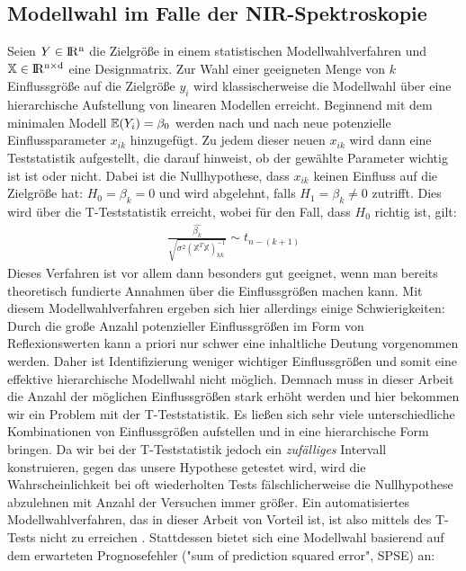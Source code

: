 	\subsection{Modellwahl im Falle der NIR-Spektroskopie}
	\label{ssec:modellwahl_nir}
	Seien $Y\in \rm I\!R^{n}$ die Zielgröße in einem statistischen Modellwahlverfahren und $\mathbb{X} \in \rm I\!R^{n \times d}$ eine Designmatrix.
	Zur Wahl einer geeigneten Menge von $k$ Einflussgröße auf die Zielgröße $y_i$  wird klassischerweise die Modellwahl über eine hierarchische Aufstellung von linearen Modellen erreicht. 
	Beginnend mit dem minimalen Modell $\operatorname{\mathbb{E}}(Y_i) = \beta_0$ werden nach und nach neue potenzielle Einflussparameter $x_{ik}$ hinzugefügt. 
	Zu jedem dieser neuen $x_{ik}$ wird dann eine Teststatistik aufgestellt, die darauf hinweist, ob der gewählte Parameter wichtig ist ist oder nicht. 
	Dabei ist die Nullhypothese, dass $x_{ik}$ keinen Einfluss auf die Zielgröße hat: $ H_0 = \beta_k = 0$ und wird abgelehnt, falls $H_1 = \beta_k \neq 0$ zutrifft.
	Dies wird über die T-Teststatistik erreicht,  wobei für den Fall, dass $H_0$ richtig ist, gilt:
	\begin{align*}
		\frac{\hat{\beta_k}}{\sqrt{\sigma^2(\mathbb{X}^T\mathbb{X})^{-1}_{kk}}} \sim t_{n-(k+1)}
	\end{align*}
	Dieses Verfahren ist vor allem dann besonders gut geeignet, wenn man bereits theoretisch fundierte Annahmen über die Einflussgrößen machen kann.
	Mit diesem Modellwahlverfahren ergeben sich hier allerdings einige Schwierigkeiten:
	Durch die große Anzahl potenzieller Einflussgrößen im Form von Reflexionswerten kann a priori nur schwer eine inhaltliche Deutung vorgenommen werden.
	Daher ist Identifizierung weniger wichtiger Einflussgrößen und somit eine effektive hierarchische Modellwahl nicht möglich. 
	Demnach muss in dieser Arbeit die Anzahl der möglichen Einflussgrößen stark erhöht werden und hier bekommen wir ein Problem mit der T-Teststatistik. 
	Es ließen sich sehr viele unterschiedliche Kombinationen von Einflussgrößen aufstellen und in eine hierarchische Form bringen. 
	Da wir bei der T-Teststatistik jedoch ein \textit{zufälliges} Intervall konstruieren, gegen das unsere Hypothese getestet wird, wird die Wahrscheinlichkeit bei oft wiederholten Tests fälschlicherweise die Nullhypothese abzulehnen mit Anzahl der Versuchen immer größer. 
	Ein automatisiertes Modellwahlverfahren, das in dieser Arbeit von Vorteil ist, ist also mittels des T-Tests nicht zu erreichen \cite{Schumacher.2019}.
	Stattdessen bietet sich eine Modellwahl basierend auf dem erwarteten Prognosefehler ("sum of prediction squared error", SPSE) an:
